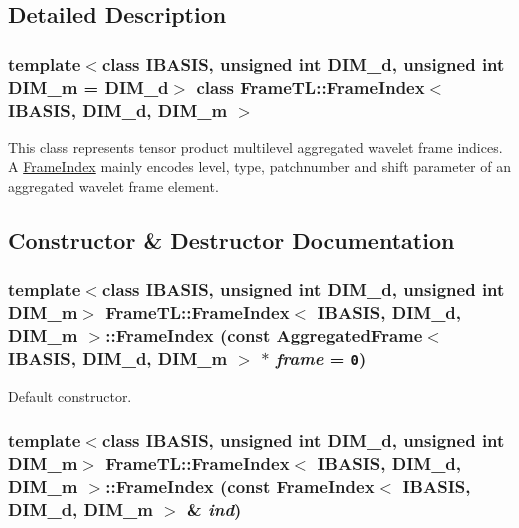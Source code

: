 \subsection{Detailed Description}
\subsubsection*{template$<$class IBASIS, unsigned int DIM\_\-d, unsigned int DIM\_\-m = DIM\_\-d$>$ class FrameTL::FrameIndex$<$ IBASIS, DIM\_\-d, DIM\_\-m $>$}

This class represents tensor product multilevel aggregated wavelet frame indices. A \hyperlink{classFrameTL_1_1FrameIndex}{FrameIndex} mainly encodes level, type, patchnumber and shift parameter of an aggregated wavelet frame element. 

\subsection{Constructor \& Destructor Documentation}
\hypertarget{classFrameTL_1_1FrameIndex_3a0967cbcfddd03202189f8610f890c2}{
\subsubsection[FrameIndex]{\setlength{\rightskip}{0pt plus 5cm}template$<$class IBASIS, unsigned int DIM\_\-d, unsigned int DIM\_\-m$>$ {\bf FrameTL::FrameIndex}$<$ IBASIS, DIM\_\-d, DIM\_\-m $>$::{\bf FrameIndex} (const {\bf AggregatedFrame}$<$ IBASIS, DIM\_\-d, DIM\_\-m $>$ $\ast$ {\em frame} = {\tt 0})}}
\label{classFrameTL_1_1FrameIndex_3a0967cbcfddd03202189f8610f890c2}


Default constructor. \hypertarget{classFrameTL_1_1FrameIndex_d4115fc6eafd1487e0ee6c38f21f7cdc}{
\subsubsection[FrameIndex]{\setlength{\rightskip}{0pt plus 5cm}template$<$class IBASIS, unsigned int DIM\_\-d, unsigned int DIM\_\-m$>$ {\bf FrameTL::FrameIndex}$<$ IBASIS, DIM\_\-d, DIM\_\-m $>$::{\bf FrameIndex} (const {\bf FrameIndex}$<$ IBASIS, DIM\_\-d, DIM\_\-m $>$ \& {\em ind})}}
\label{classFrameTL_1_1FrameIndex_d4115fc6eafd1487e0ee6c38f21f7cdc}


